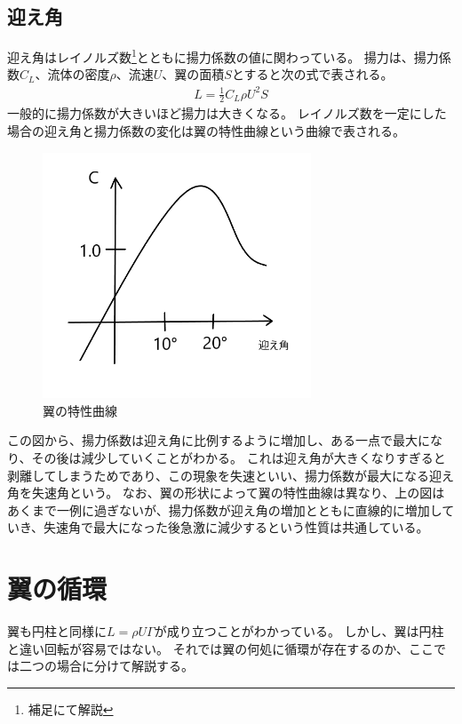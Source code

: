 \documentclass[10pt,b5paper,papersize,dvipdfmx]{jsbook}
\begin{document}
\subsection{迎え角}
迎え角はレイノルズ数\footnote{補足にて解説}とともに揚力係数の値に関わっている。
揚力は、揚力係数$C_L$、流体の密度$\rho $、流速$U$、翼の面積$S$とすると次の式で表される。
\begin{align}
  L = \frac{1}{2}C_L\rho U^2S
\end{align}
一般的に揚力係数が大きいほど揚力は大きくなる。
レイノルズ数を一定にした場合の迎え角と揚力係数の変化は翼の特性曲線という曲線で表される。
\par
\begin{figure}[ht]
  \centering
  \includegraphics[width=80mm]{img/ryuutai8.png}
  \caption{翼の特性曲線}
\end{figure}
この図から、揚力係数は迎え角に比例するように増加し、ある一点で最大になり、その後は減少していくことがわかる。
これは迎え角が大きくなりすぎると剥離してしまうためであり、この現象を失速といい、揚力係数が最大になる迎え角を失速角という。
なお、翼の形状によって翼の特性曲線は異なり、上の図はあくまで一例に過ぎないが、揚力係数が迎え角の増加とともに直線的に増加していき、失速角で最大になった後急激に減少するという性質は共通している。
\section{翼の循環}
翼も円柱と同様に$L = \rho U\Gamma $が成り立つことがわかっている。
しかし、翼は円柱と違い回転が容易ではない。
それでは翼の何処に循環が存在するのか、ここでは二つの場合に分けて解説する。
\end{document}

